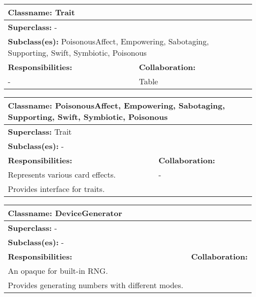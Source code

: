 

\begin{table}
    \centering
    \begin{tabular}{|l|l|}
         \toprule
         \multicolumn{2}{|l|}{\textbf{Classname: }Trait} \\
         \midrule
         \multicolumn{2}{|l|}{\textbf{Superclass: }-} \\
         \multicolumn{2}{|l|}{\textbf{Subclass(es): }PoisonousAffect, Empowering, Sabotaging, Supporting, Swift, Symbiotic, Poisonous} \\
         \midrule
         \textbf{Responsibilities:} & \textbf{Collaboration:} \\
         - & Table  \\ 
         \bottomrule
    \end{tabular}
    \label{tab:my_label}
\end{table}

\begin{table}
    \centering
    \begin{tabular}{|l|l|}
         \toprule
         \multicolumn{2}{|l|}{\textbf{Classname: }PoisonousAffect, Empowering, Sabotaging, Supporting, Swift, Symbiotic, Poisonous} \\
         \midrule
         \multicolumn{2}{|l|}{\textbf{Superclass: }Trait} \\
         \multicolumn{2}{|l|}{\textbf{Subclass(es): }-} \\
         \midrule
         \textbf{Responsibilities:} & \textbf{Collaboration:} \\
         Represents various card effects. & - \\
         Provides interface for traits. & \\
         \bottomrule
    \end{tabular}
    \label{tab:my_label}
\end{table}

\begin{table}
    \centering
    \begin{tabular}{|l|l|}
         \toprule
         \multicolumn{2}{|l|}{\textbf{Classname: }DeviceGenerator} \\
         \midrule
         \multicolumn{2}{|l|}{\textbf{Superclass: }-} \\
         \multicolumn{2}{|l|}{\textbf{Subclass(es): }-} \\
         \midrule
         \textbf{Responsibilities:} & \textbf{Collaboration:} \\
         An opaque for built-in RNG.&  \\ 
         Provides generating numbers with different modes. &  \\ 
         \bottomrule
    \end{tabular}
    \label{tab:my_label}
\end{table}

